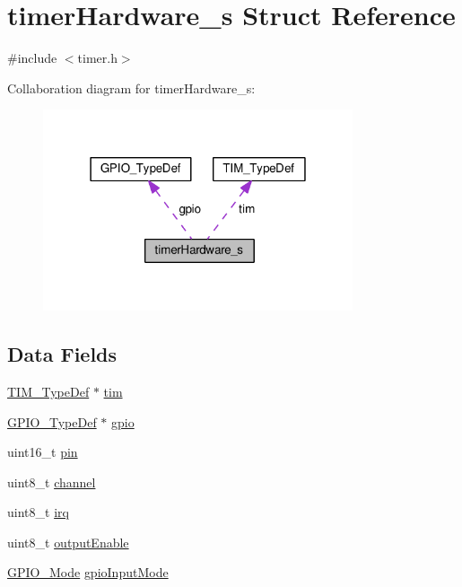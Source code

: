 \hypertarget{structtimerHardware__s}{\section{timer\+Hardware\+\_\+s Struct Reference}
\label{structtimerHardware__s}
}


{\ttfamily \#include $<$timer.\+h$>$}



Collaboration diagram for timer\+Hardware\+\_\+s\+:\nopagebreak
\begin{figure}[H]
\begin{center}
\leavevmode
\includegraphics[width=259pt]{structtimerHardware__s__coll__graph}
\end{center}
\end{figure}
\subsection*{Data Fields}
\begin{DoxyCompactItemize}
\item 
\hyperlink{structTIM__TypeDef}{T\+I\+M\+\_\+\+Type\+Def} $\ast$ \hyperlink{structtimerHardware__s_a2fdef5e9d564b356d89244cbf5bad80e}{tim}
\item 
\hyperlink{structGPIO__TypeDef}{G\+P\+I\+O\+\_\+\+Type\+Def} $\ast$ \hyperlink{structtimerHardware__s_a71ba171eab3c4b2b175a0f51886af8a1}{gpio}
\item 
uint16\+\_\+t \hyperlink{structtimerHardware__s_a2abeb9e9b441c53beb2190ecf699b6d2}{pin}
\item 
uint8\+\_\+t \hyperlink{structtimerHardware__s_af58b428cd60ec326a422943a807a006d}{channel}
\item 
uint8\+\_\+t \hyperlink{structtimerHardware__s_ab217991f2e2733303ff2bb2771253260}{irq}
\item 
uint8\+\_\+t \hyperlink{structtimerHardware__s_a46d0db2428ada03e606c218d93ec6e3b}{output\+Enable}
\item 
\hyperlink{test_2unit_2platform_8h_ae647a44ad55704d3f447db1de2858e1b}{G\+P\+I\+O\+\_\+\+Mode} \hyperlink{structtimerHardware__s_af495441268be39c4acb670a8d0474482}{gpio\+Input\+Mode}
\end{DoxyCompactItemize}


